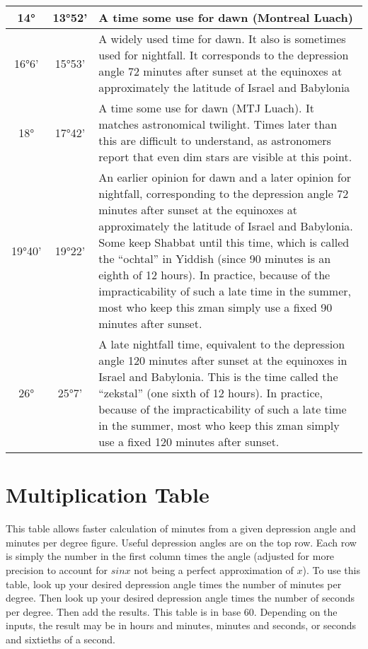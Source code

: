 \begin{tabular}{c | c | p{}}
	14°&13°52'&A time some use for dawn (Montreal Luach)\\\hline
	16°6'&15°53'&A widely used time for dawn. It also is sometimes used for nightfall. It corresponds to the depression angle 72 minutes after sunset at the equinoxes at approximately the latitude of Israel and Babylonia\\\hline
	18°&17°42'&A time some use for dawn (MTJ Luach). It matches astronomical twilight. Times later than this are difficult to understand, as astronomers report that even dim stars are visible at this point.\\\hline
	19°40'&19°22'&An earlier opinion for dawn and a later opinion for nightfall, corresponding to the depression angle 72 minutes after sunset at the equinoxes at approximately the latitude of Israel and Babylonia. Some keep Shabbat until this time, which is called the “ochtal” in Yiddish (since 90 minutes is an eighth of 12 hours). In practice, because of the impracticability of such a late time in the summer, most who keep this zman simply use a fixed 90 minutes after sunset.\\\hline
	26°&25°7'&A late nightfall time, equivalent to the depression angle 120 minutes after sunset at the equinoxes in Israel and Babylonia. This is the time called the “zekstal” (one sixth of 12 hours). In practice, because of the impracticability of such a late time in the summer, most who keep this zman simply use a fixed 120 minutes after sunset.\\\hline
\end{tabular}
\newpage
\section{Multiplication Table}

This table allows faster calculation of minutes from a given depression angle and minutes per degree figure. Useful depression angles are on the top row. Each row is simply the number in the first column times the angle (adjusted for more precision to account for $sin{x}$ not being a perfect approximation of $x$). To use this table, look up your desired depression angle times the number of minutes per degree. Then look up your desired depression angle times the number of seconds per degree. Then add the results. This table is in base 60. Depending on the inputs, the result may be in hours and minutes, minutes and seconds, or seconds and sixtieths of a second. 


